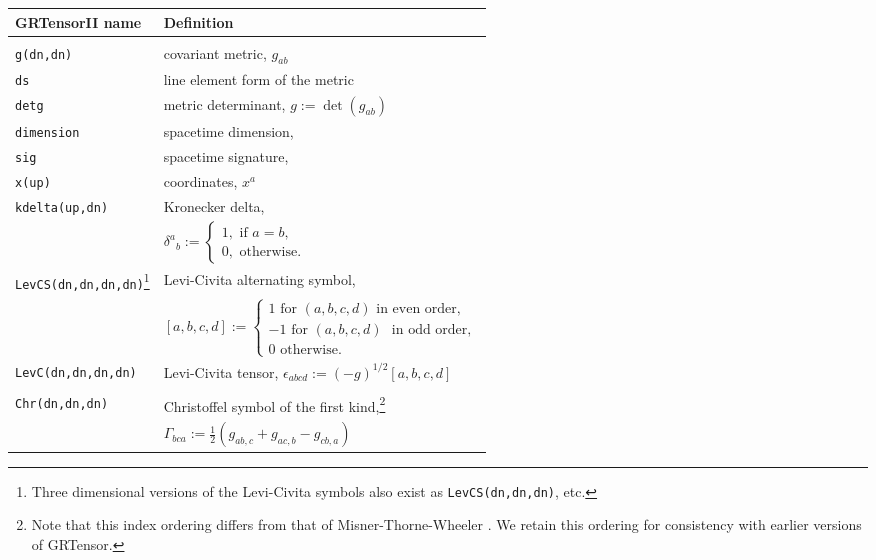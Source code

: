 \documentclass{article}
\begin{document}
{{{\renewcommand{\baselinestretch}{1.5}\normalsize
\begin{longtable}[c]{lp{}}\hline\hline
GRTensorII name & Definition\\ \hline
& \\
\texttt{g(dn,dn)}	& covariant metric, $g_{ab}$\\
\texttt{ds}		& line element form of the metric\\
\texttt{detg}		& metric determinant, $g := \det (g_{ab})$\\
\texttt{dimension}	& spacetime dimension,\\
\texttt{sig}		& spacetime signature,\\
\texttt{x(up)}		& coordinates, $x^a$\\
%
\texttt{kdelta(up,dn)}	& Kronecker delta, \\ 
			& $\delta^a{}_b :=
			    \left\{
			      \begin{array}{l}
			        1, \text{~if~} a=b,\\
			        0, \text{~otherwise.}
			      \end{array}
			    \right. $ \\
\texttt{LevCS(dn,dn,dn,dn)}\footnote{Three dimensional versions of the
Levi-Civita symbols also exist as \texttt{LevCS(dn,dn,dn)}, etc.}
			& Levi-Civita alternating symbol,\\
			& $ [a,b,c,d] :=
			    \left\{
			      \begin{array}{l}
				1 \text{~for~}(a,b,c,d)
				\text{~in even order}, \\
			        -1 \text{~for~} (a,b,c,d)
				\text{~ in odd order},\\
				0 \text{~otherwise.}
			      \end{array}
			    \right. $ \\
\texttt{LevC(dn,dn,dn,dn)} & Levi-Civita tensor, 
			$\epsilon_{abcd} := (-g)^{1/2}[a,b,c,d]$\\
& \\
%
\texttt{Chr(dn,dn,dn)}	& Christoffel symbol of the first 
			  kind,\footnote{
			  \parbox[t]{\textwidth}{
			  \renewcommand{\baselinestretch}{1}\small
			  Note that this index ordering
			  differs from that of Misner-Thorne-Wheeler
			  \cite{mtw}. 
			  We retain this ordering for 
			  consistency with earlier versions of GRTensor.
			  \renewcommand{\baselinestretch}{1}\normalsize}}\\
			& $ \Gamma_{bca} := \frac{1}{2}(g_{ab,c} + g_{ac,b} -
			     g_{cb,a})$\\

\end{longtable}}}}
\end{document}
